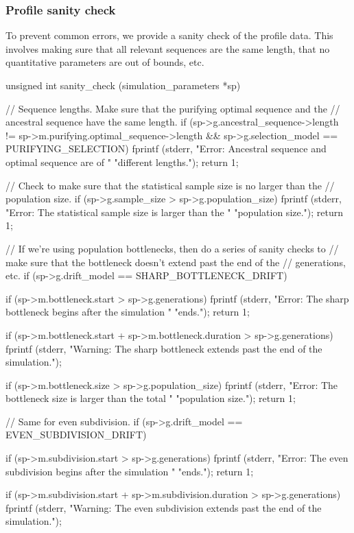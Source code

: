 \documentclass{article}
\begin{document}
      \subsubsection{Profile sanity check}
	\label{sec:profile-sanity-check}

	To prevent common errors, we provide a sanity check of the profile
	data.  This involves making sure that all relevant sequences are the
	same length, that no quantitative parameters are out of bounds, etc.

\begin{ccode}
unsigned int sanity_check (simulation_parameters *sp) {
  // Sequence lengths. Make sure that the purifying optimal sequence and the
  // ancestral sequence have the same length.
  if (sp->g.ancestral_sequence->length != sp->m.purifying.optimal_sequence->length &&
      sp->g.selection_model == PURIFYING_SELECTION) {
    fprintf (stderr, "Error: Ancestral sequence and optimal sequence are of "
		     "different lengths.\n");
    return 1;
  }

  // Check to make sure that the statistical sample size is no larger than the
  // population size.
  if (sp->g.sample_size > sp->g.population_size) {
    fprintf (stderr, "Error: The statistical sample size is larger than the "
		     "population size.\n");
    return 1;
  }

  // If we're using population bottlenecks, then do a series of sanity checks to
  // make sure that the bottleneck doesn't extend past the end of the
  // generations, etc.
  if (sp->g.drift_model == SHARP_BOTTLENECK_DRIFT) {
    if (sp->m.bottleneck.start > sp->g.generations) {
      fprintf (stderr, "Error: The sharp bottleneck begins after the simulation "
		       "ends.\n");
      return 1;
    }

    if (sp->m.bottleneck.start + sp->m.bottleneck.duration > sp->g.generations)
      fprintf (stderr, "Warning: The sharp bottleneck extends past the end of the simulation.\n");

    if (sp->m.bottleneck.size > sp->g.population_size) {
      fprintf (stderr, "Error: The bottleneck size is larger than the total "
		       "population size.\n");
      return 1;
    }
  }

  // Same for even subdivision.
  if (sp->g.drift_model == EVEN_SUBDIVISION_DRIFT) {
    if (sp->m.subdivision.start > sp->g.generations) {
      fprintf (stderr, "Error: The even subdivision begins after the simulation "
		       "ends.\n");
      return 1;
    }

    if (sp->m.subdivision.start + sp->m.subdivision.duration > sp->g.generations)
      fprintf (stderr, "Warning: The even subdivision extends past the end of the simulation.\n");

}}
\end{ccode}
\end{document}

